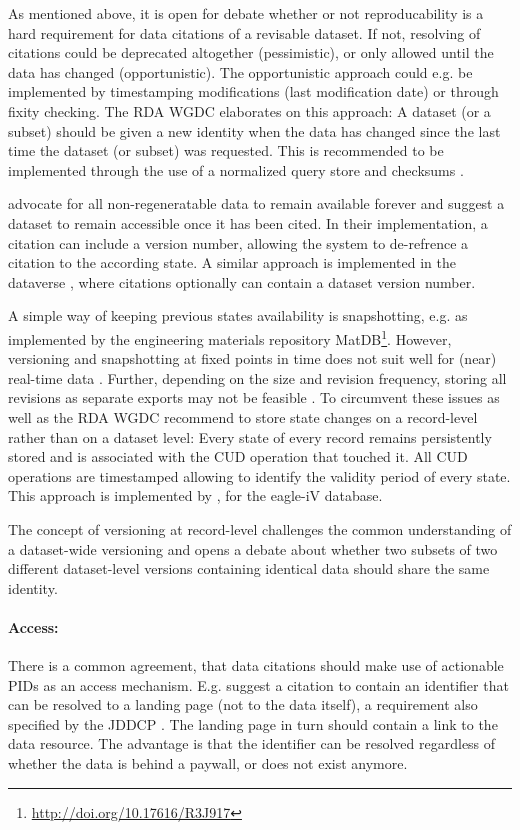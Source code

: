 \documentclass[letterpaper, twocolumn, parskip=half, fontsize=8pt, DIV=calc]{scrartcl}
\begin{document}
As mentioned above, it is open for debate whether or not reproducability is a hard requirement for data citations of a revisable dataset. If not, resolving of citations could be deprecated altogether (pessimistic), or only allowed until the data has changed (opportunistic). The opportunistic approach could e.g. be implemented by timestamping modifications (last modification date) or through fixity checking. The \gls{RDA} \gls{WGDC} \citep{Rauber2015} elaborates on this approach: A dataset (or a subset) should be given a new identity when the data has changed since the last time the dataset (or subset) was requested. This is recommended to be implemented through the use of a normalized query store and checksums \citep{Ball2015}.

\cite{Gray2002} advocate for all non-regeneratable data to remain available forever and  \cite{Buneman2010} suggest a dataset to remain accessible once it has been cited. In their implementation, a citation can include a version number, allowing the system to de-refrence a citation to the according state. A similar approach is implemented in the dataverse \citep{Crosas2011}, where citations optionally can contain a dataset version number. 

A simple way of keeping previous states availability is snapshotting, e.g. as implemented by the engineering materials repository MatDB\footnote{\url{http://doi.org/10.17616/R3J917}}.
However, versioning and snapshotting at fixed points in time does not suit well for (near) real-time data  \citep{Huber2015}. Further, depending on the size and revision frequency, storing all revisions as separate exports may not be feasible \citep{Rauber2015}. To circumvent these issues \cite{AltKin07} as well as the \gls{RDA} \gls{WGDC} \citep{Rauber2015a, Rauber2015, Proll2013} recommend to store state changes on a record-level rather than on a dataset level: Every state of every record remains persistently stored and is associated with the \gls{CUD} operation that touched it. All \gls{CUD} operations are timestamped allowing to identify the validity period of every state. This approach is implemented by \cite{Alawini2017}, for the eagle-iV database. 

The concept of versioning at record-level challenges the common understanding of a dataset-wide versioning and opens a debate about whether two subsets of two different dataset-level versions containing identical data should share the same identity.


\paragraph{Access:}
There is a common agreement, that data citations should make use of actionable \glspl{PID} as an access mechanism. E.g. \cite{AltKin07} suggest a citation to contain an identifier that can be resolved to a landing page (not to the data itself), a requirement also specified by the \gls{JDDCP} \citep{JDDCP2014, Altman2015}.
The landing page in turn should contain a link to the data resource. The advantage is that the identifier can be resolved regardless of whether the data is behind a paywall, or does not exist anymore.
\end{document}
